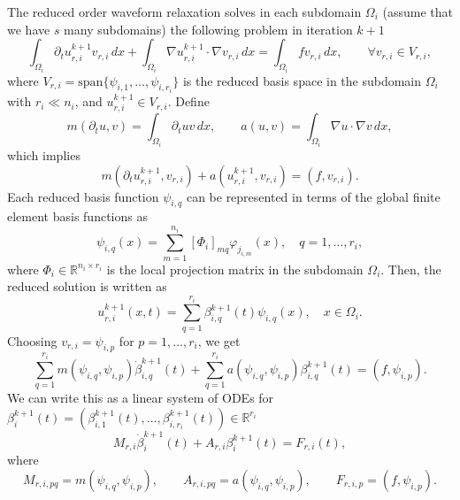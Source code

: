 \documentclass[a4paper, 11pt]{article}
\theoremstyle{plain}
\theoremstyle{definition}
\theoremstyle{remark}
\begin{document}
The reduced order waveform relaxation solves in each subdomain $\Omega_i$ (assume that we have $s$ many subdomains) the following problem in iteration $k+1$
\begin{equation*}
    \int_{\Omega_{i}}\partial_{t} u_{r, i}^{k+1} v_{r, i}\,dx + \int_{\Omega_{i}}\nabla u_{r, i}^{k+1} \cdot \nabla v_{r, i}\,dx = \int_{\Omega_{i}}fv_{r, i}\,dx, \qquad \forall v_{r, i}\in V_{r, i},
\end{equation*}
where $V_{r, i} = \text{span}\{\psi_{i, 1}, \ldots, \psi_{i, r_{i}}\}$ is the reduced basis space in the subdomain $\Omega_{i}$ with $r_{i} \ll n_{i}$, and $u_{r, i}^{k+1}\in V_{r, i}$. Define
\begin{equation*}
    m(\partial_{t} u, v) = \int_{\Omega_{i}}\partial_{t} u v\,dx, \qquad a(u, v) = \int_{\Omega_{i}}\nabla u \cdot \nabla v\,dx, 
\end{equation*}
which implies
\begin{equation*}
    m(\partial_{t} u_{r, i}^{k+1}, v_{r, i}) + a(u_{r, i}^{k+1}, v_{r, i}) = (f, v_{r, i}).
\end{equation*}
Each reduced basis function $\psi_{i, q}$ can be represented in terms of the global finite element basis functions as
\begin{equation*}
    \psi_{i, q}(x) = \sum_{m = 1}^{n_{i}}\left[\Phi_{i}\right]_{mq}\varphi_{j_{i, m}}(x), \quad q = 1, \ldots, r_{i},
\end{equation*}
where $\Phi_{i}\in \mathbb{R}^{n_{i}\times r_{i}}$ is the local projection matrix in the subdomain $\Omega_{i}$. Then, the reduced solution is written as
\begin{equation*}
    u_{r, i}^{k+1}(x, t) = \sum_{q = 1}^{r_i}\beta^{k+1}_{i, q}(t)\psi_{i, q}(x), \quad x\in \Omega_{i}.
\end{equation*}
Choosing $v_{r, i} = \psi_{i, p}$ for $p = 1, \ldots, r_{i}$, we get
\begin{equation*}
    \sum_{q = 1}^{r_i}m(\psi_{i, q}, \psi_{i, p})\dot{\beta}^{k+1}_{i, q}(t) + \sum_{q = 1}^{r_i}a(\psi_{i, q}, \psi_{i, p})\beta^{k+1}_{i, q}(t) = (f, \psi_{i, p}).
\end{equation*}
We can write this as a linear system of ODEs for $\beta_{i}^{k+1}(t) = (\beta^{k+1}_{i, 1}(t), \ldots, \beta^{k+1}_{i, r_{i}}(t))\in \mathbb{R}^{r_{i}}$
\begin{equation*}
    M_{r, i}\dot{\beta}_{i}^{k+1}(t) + A_{r, i}\beta_{i}^{k+1}(t) = F_{r, i}(t),
\end{equation*}
where
\begin{equation*}
    M_{r, i, pq} = m(\psi_{i, q}, \psi_{i, p}), \qquad A_{r, i, pq} = a(\psi_{i, q}, \psi_{i, p}), \qquad F_{r, i, p} = (f, \psi_{i, p}).
\end{equation*}
\end{document}
